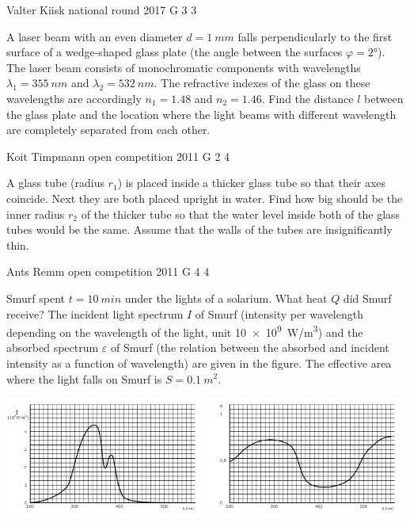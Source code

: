 \documentclass[11pt]{article}
\begin{document}
{Valter Kiisk} %
{national round} %
{2017} %
{G 3} %
{3} %
{

\ifEngStatement
A laser beam with an even diameter $d=\SI{1}{mm}$ falls perpendicularly to the first surface of a wedge-shaped glass plate (the angle between the surfaces $\varphi=\ang{2}$). The laser beam consists of monochromatic components with wavelengths $\lambda_1=\SI{355}{nm}$ and $\lambda_2=\SI{532}{nm}$. The refractive indexes of the glass on these wavelengths are accordingly $n_1=\num{1.48}$ and $n_2=\num{1.46}$. Find the distance $l$ between the glass plate and the location where the light beams with different wavelength are completely separated from each other.
\fi
}

{Koit Timpmann} %
{open competition} %
{2011} %
{G 2} %
{4} %
{

\ifEngStatement
A glass tube (radius $r_1$) is placed inside a thicker glass tube so that their axes coincide. Next they are both placed upright in water. Find how big should be the inner radius $r_2$ of the thicker tube so that the water level inside both of the glass tubes would be the same. Assume that the walls of the tubes are insignificantly thin.
\fi
}

{Ants Remm} %
{open competition} %
{2011} %
{G 4} %
{4} %
{

\ifEngStatement
Smurf spent $t = \SI{10}{min} $ under the lights of a solarium. What heat $ Q $ did Smurf receive? The incident light spectrum $I$ of Smurf (intensity per wavelength depending on the wavelength of the light, unit \SI{10e9}{W/m^3}) and the absorbed spectrum $\varepsilon$ of Smurf (the relation between the absorbed and incident intensity as a function of wavelength) are given in the figure. The effective area where the light falls on Smurf is $ S = \SI{0,1}{m^2} $.

\begin{center}
\includegraphics[width=0.49\textwidth]{2011-lahg-04-I}
\includegraphics[width=0.49\textwidth]{2011-lahg-04-epsilon}
\end{center}
\fi
}
\end{document}
